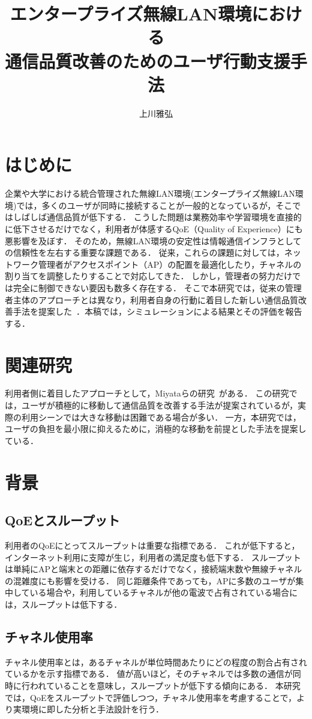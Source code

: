 \documentclass[dvipdfmx,twocolumn]{jsarticle}
\title{エンタープライズ無線LAN環境における\\通信品質改善のためのユーザ行動支援手法}
\author{上川雅弘}
\newcommand{\Note}[1]{\noindent \textbf{\textcolor{blue}{#1}}}
\begin{document}
\maketitle

\section{はじめに}
企業や大学における統合管理された無線LAN環境(エンタープライズ無線LAN環境)では，多くのユーザが同時に接続することが一般的となっているが，そこではしばしば通信品質が低下する．
こうした問題は業務効率や学習環境を直接的に低下させるだけでなく，利用者が体感するQoE（Quality of Experience）にも悪影響を及ぼす．
そのため，無線LAN環境の安定性は情報通信インフラとしての信頼性を左右する重要な課題である．
従来，これらの課題に対しては，ネットワーク管理者がアクセスポイント（AP）の配置を最適化したり，チャネルの割り当てを調整したりすることで対応してきた．
しかし，管理者の努力だけでは完全に制御できない要因も数多く存在する．
そこで本研究では，従来の管理者主体のアプローチとは異なり，利用者自身の行動に着目した新しい通信品質改善手法を提案した~\cite{kamikawa2025}．本稿では，シミュレーションによる結果とその評価を報告する．
\section{関連研究}
利用者側に着目したアプローチとして，Miyataらの研究~\cite{Miyata2012}がある．
この研究では，ユーザが積極的に移動して通信品質を改善する手法が提案されているが，実際の利用シーンでは大きな移動は困難である場合が多い．
一方，本研究では，ユーザの負担を最小限に抑えるために，消極的な移動を前提とした手法を提案している．
\section{背景}
\subsection{QoEとスループット}
利用者のQoEにとってスループットは重要な指標である．
これが低下すると，インターネット利用に支障が生じ，利用者の満足度も低下する．
スループットは単純にAPと端末との距離に依存するだけでなく，接続端末数や無線チャネルの混雑度にも影響を受ける．
同じ距離条件であっても，APに多数のユーザが集中している場合や，利用しているチャネルが他の電波で占有されている場合には，スループットは低下する．
\subsection{チャネル使用率}
チャネル使用率とは，あるチャネルが単位時間あたりにどの程度の割合占有されているかを示す指標である．
値が高いほど，そのチャネルでは多数の通信が同時に行われていることを意味し，スループットが低下する傾向にある．
本研究では，QoEをスループットで評価しつつ，チャネル使用率を考慮することで，より実環境に即した分析と手法設計を行う．
\end{document}
